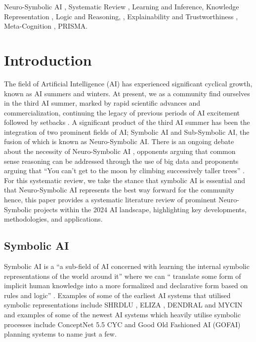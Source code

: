 \documentclass[hf]{ceurart}
\begin{document}
\begin{keywords}
  Neuro-Symbolic AI \sep 
  Systematic Review \sep 
  Learning and Inference\sep
  Knowledge Representation \sep
  Logic and Reasoning, \sep
  Explainability and Trustworthiness \sep
  Meta-Cognition \sep
  PRISMA.
\end{keywords}


\maketitle


\section{Introduction} \label{sec:intro}
The field of Artificial Intelligence (AI) has experienced significant cyclical growth, known as AI summers and winters. At present, we as a community find ourselves in the third AI summer, marked by rapid scientific advances and commercialization, continuing the legacy of previous periods of AI excitement followed by setbacks \cite{Kautz2022}. A significant product of the third AI summer has been the integration of two prominent fields of AI; Symbolic AI and Sub-Symbolic AI, the fusion of which is known as Neuro-Symbolic AI. There is an ongoing debate about the necessity of Neuro-Symbolic AI \cite{Dingli2023}, opponents arguing that common sense reasoning can be addressed through the use of big data \cite{lecun2022path} and proponents arguing that \enquote{You can’t get to the moon by climbing successively taller trees} \cite{Marcus2019}. For this systematic review, we take the stance that symbolic AI is essential and that Neuro-Symbolic AI represents the best way forward for the community hence, this paper provides a systematic literature review of prominent Neuro-Symbolic projects within the 2024 AI landscape, highlighting key developments, methodologies, and applications. 

\subsection{\textbf{Symbolic AI}}\label{sub:symbolic-AI}
Symbolic AI is a \enquote{a sub-field of AI concerned with learning the internal symbolic representations of the world around it} where we can \enquote{ translate some form of implicit human knowledge into a more formalized and declarative form based on rules and logic} \cite{Dingli2023}. Examples of some of the earliest AI systems that utilised symbolic representations include SHRDLU \cite{SHRDLU}, ELIZA \cite{Weizenbaum1966},  DENDRAL \cite{Lindsay1980} and MYCIN\cite{Melle1978} and examples of some of the newest AI systems which heavily utilise symbolic processes include ConceptNet 5.5 \cite{Speer2016} CYC  \cite{Lenat2023} and Good Old Fashioned AI (GOFAI) planning systems \cite{Edelkamp2004} to name just a few.
\end{document}
